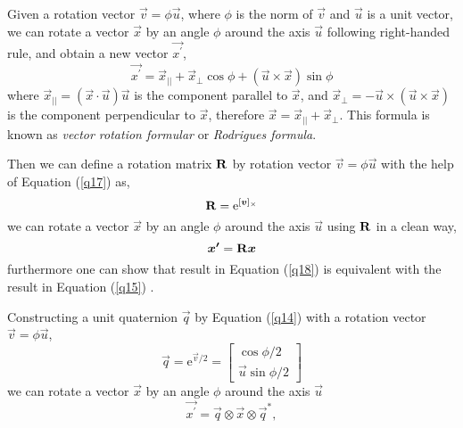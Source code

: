 Given a rotation vector $\vec{v} = \phi\vec{u}$, where $\phi$ is the norm of $\vec{v}$ and $\vec{u}$ is a unit vector, we can rotate a vector $\vec{x}$ by an angle $\phi$ around the axis $\vec{u}$ following right-handed rule, and obtain a new vector $\vec{x^{\prime}}$,
\begin{equation}\label{q15}
	\vec{x^{\prime}} = \vec{x}_{||} + \vec{x}_{\bot}\cos{\phi} + (\vec{u} \times \vec{x})\sin{\phi}
\end{equation}
where $\vec{x}_{||} = (\vec{x} \cdot \vec{u})\vec{u}$ is the component parallel to $\vec{x}$, and $\vec{x}_{\bot} = -\vec{u} \times (\vec{u} \times \vec{x})$ is the component perpendicular to $\vec{x}$, therefore $\vec{x} = \vec{x}_{||} + \vec{x}_{\bot}$. This formula is known as \textit{vector rotation formular} or \textit{Rodrigues formula}.

Then we can define a rotation matrix $\mathbf{R}$ by rotation vector $\vec{v} = \phi\vec{u}$ with the help of Equation (\ref{q17}) as,
\begin{equation}\label{q16}
	\mathbf{R} = \mathrm{e}^{[\boldsymbol{v}]_\times}
\end{equation}
we can rotate a vector $\vec{x}$ by an angle $\phi$ around the axis $\vec{u}$ using $\mathbf{R}$ in a clean way,
\begin{equation}\label{q18}
	\boldsymbol{x^{\prime}} = \mathbf{R}\boldsymbol{x}
\end{equation}
furthermore one can show that result in Equation (\ref{q18}) is equivalent with the result in Equation (\ref{q15}) \cite{wiki:rotationformula}. 

Constructing a unit quaternion $\vec{q}$ by Equation (\ref{q14}) with a rotation vector $\vec{v} = \phi\vec{u}$, 
\begin{equation}\label{q19}
	\vec{q} = \mathrm{e}^{\vec{v}/2} = \begin{bmatrix}
											\cos{\phi / 2}  \\ \vec{u}\sin{\phi / 2} 
									  \end{bmatrix}
\end{equation}
we can rotate a vector $\vec{x}$ by an angle $\phi$ around the axis $\vec{u}$
\begin{equation}\label{q20}
	\vec{x^{\prime}} = \vec{q} \otimes \vec{x} \otimes \vec{q}^{*},
\end{equation}

